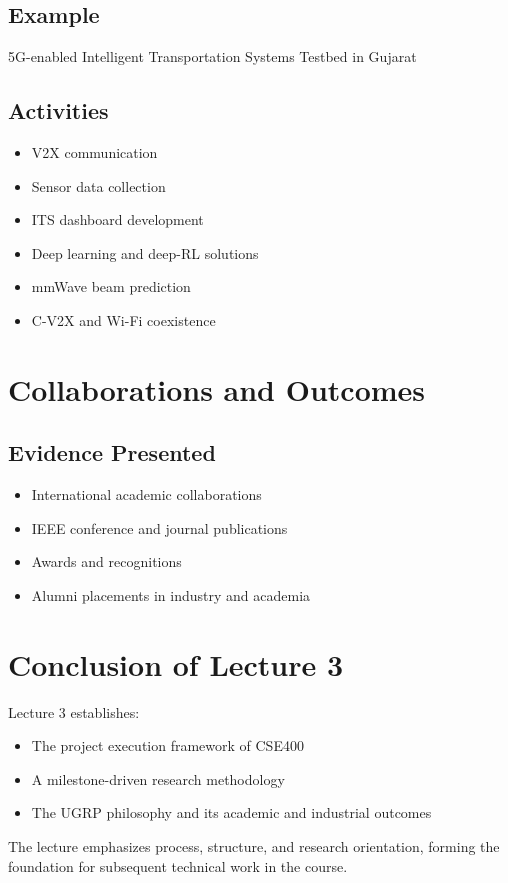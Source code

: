 \documentclass[12pt]{article}
\begin{document}
\subsection{Example}
5G-enabled Intelligent Transportation Systems Testbed in Gujarat

\subsection{Activities}
\begin{itemize}
    \item V2X communication
    \item Sensor data collection
    \item ITS dashboard development
    \item Deep learning and deep-RL solutions
    \item mmWave beam prediction
    \item C-V2X and Wi-Fi coexistence
\end{itemize}

\section{Collaborations and Outcomes}

\subsection{Evidence Presented}
\begin{itemize}
    \item International academic collaborations
    \item IEEE conference and journal publications
    \item Awards and recognitions
    \item Alumni placements in industry and academia
\end{itemize}

\section{Conclusion of Lecture 3}

Lecture 3 establishes:
\begin{itemize}
    \item The project execution framework of CSE400
    \item A milestone-driven research methodology
    \item The UGRP philosophy and its academic and industrial outcomes
\end{itemize}

The lecture emphasizes process, structure, and research orientation, forming the foundation for subsequent technical work in the course.
\end{document}
